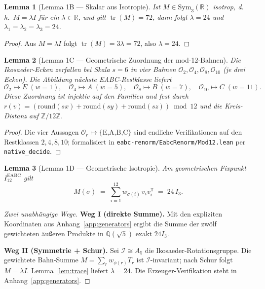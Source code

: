 \documentclass[11pt,a4paper]{article}
\newtheorem{lemma}{Lemma}
\newcommand{\R}{\mathbb{R}}
\newcommand{\Q}{\mathbb{Q}}
\newcommand{\Z}{\mathbb{Z}}
\begin{document}
\begin{lemma}[Lemma 1B — Skalar aus Isotropie]
\label{lem:scalar}
Ist $M\in\mathrm{Sym}_3(\R)$ isotrop, d.\,h.\ $M=\lambda I$ für ein $\lambda\in\R$,
und gilt $\operatorname{tr}(M)=72$, dann folgt $\lambda=24$ und
$\lambda_1=\lambda_2=\lambda_3=24$.
\end{lemma}

\begin{proof}
Aus $M=\lambda I$ folgt $\operatorname{tr}(M)=3\lambda=72$, also $\lambda=24$.
\end{proof}

\begin{lemma}[Lemma 1C — Geometrische Zuordnung der mod-12-Bahnen]
\label{lem:orbit-assignment}
Die Ikosaeder-Ecken zerfallen bei Skala $s=6$ in vier Bahnen
$\mathcal{O}_2,\mathcal{O}_4,\mathcal{O}_8,\mathcal{O}_{10}$
(je drei Ecken).
Die Abbildung \emph{nächste EABC-Restklasse} liefert
\[
  \mathcal{O}_2\mapsto E\;(w=1),\quad
  \mathcal{O}_4\mapsto A\;(w=5),\quad
  \mathcal{O}_8\mapsto B\;(w=7),\quad
  \mathcal{O}_{10}\mapsto C\;(w=11).
\]
Diese Zuordnung ist injektiv auf den Familien und fest durch
$r(v)=(\mathrm{round}(sx)+\mathrm{round}(sy)+\mathrm{round}(sz))\bmod 12$
und die Kreis-Distanz auf $\Z/12\Z$.
\end{lemma}

\begin{proof}
Die vier Aussagen $\mathcal{O}_r\mapsto\{\text{E,A,B,C}\}$ sind endliche
Verifikationen auf den Restklassen $2,4,8,10$; formalisiert in
\texttt{eabc-renorm/EabcRenorm/Mod12.lean} per \texttt{native\_decide}.
\end{proof}

\begin{lemma}[Lemma 1D — Geometrische Isotropie]
\label{lem:geom-iso}
Am geometrischen Fixpunkt $I_{12}^{\mathrm{EABC}}$ gilt
\[
  M(\sigma)
  \;=\;
  \sum_{i=1}^{12} w_{\sigma(i)}\, v_i v_i^{\mathsf T}
  \;=\;
  24\,I_3.
\]
\end{lemma}

\begin{proof}[Zwei unabhängige Wege]
\textbf{Weg I (direkte Summe).}
Mit den expliziten Koordinaten aus Anhang~\ref{app:generators} ergibt die
Summe der zwölf gewichteten äußeren Produkte in $\Q(\sqrt5)$ exakt $24I_3$.

\smallskip\noindent
\textbf{Weg II (Symmetrie + Schur).}
Sei $\mathcal{I}\cong A_5$ die Ikosaeder-Rotationsgruppe.
Die gewichtete Bahn-Summe $M=\sum_r w_{\phi(r)}T_r$ ist $\mathcal{I}$-invariant;
nach Schur folgt $M=\lambda I$.
Lemma~\ref{lem:trace} liefert $\lambda=24$.
Die Erzeuger-Verifikation steht in Anhang~\ref{app:generators}.
\end{proof}
\end{document}
